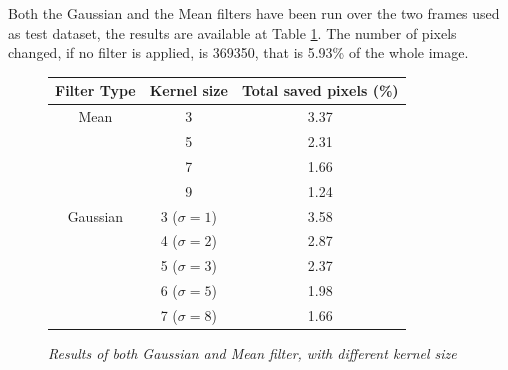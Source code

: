 \documentclass[paper=a4, fontsize=10pt]{scrartcl}	%
\begin{document}
	Both the Gaussian and the Mean filters have been run over the two frames used as test dataset, the results are available at Table \ref{fig:filter_exe}. The number of pixels changed, if no filter is applied, is 369350, that is 5.93\% of the whole image.
	\begin{figure}[H]
		\centering
		\begin{center}
			\begin{tabular}{ |c|c|c| } 
				\hline
				\textbf{Filter Type} & \textbf{Kernel size}  & \textbf{Total saved pixels}  (\%) \\ 
				\hline
				Mean & 3 & 3.37\\
					 & 5 & 2.31\\
					 & 7 & 1.66\\
					 & 9 & 1.24\\
					 \hline
				Gaussian & 3 ($\sigma=1$) & 3.58\\ 
						& 4 ($\sigma=2$) & 2.87\\ 
						& 5 ($\sigma=3$) & 2.37\\ 
						& 6 ($\sigma=5$) & 1.98\\ 
						& 7 ($\sigma=8$) & 1.66\\ 
				\hline
			\end{tabular}
		\end{center}
		\caption{\textit{Results of both Gaussian and Mean filter, with different kernel size}}
		\label{fig:filter_exe}
	\end{figure}
\end{document}
